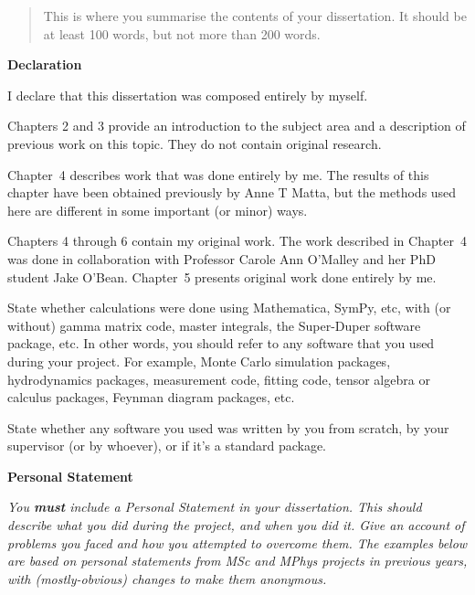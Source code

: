 \documentclass[12pt,a4paper]{report}
\numberwithin{equation}{section}
\theoremstyle{definition}
\theoremstyle{theorem}
\theoremstyle{theorem}
\theoremstyle{example}
\theoremstyle{definition}
\begin{document}
\newpage



\begin{abstract}
This is where you summarise the contents of your dissertation. It should be
at least 100 words, but not more than 200 words.
\end{abstract}


\begin{center}
\textbf{Declaration}
\end{center}

I declare that this dissertation was composed entirely by myself.

Chapters 2 and 3 provide an introduction to the subject area and a
description of previous work on this topic. They do not contain
original research.

Chapter~4 describes work that was done entirely by me. The results of
this chapter have been obtained previously by Anne T Matta, but the
methods used here are different in some important (or minor) ways.

Chapters 4 through 6 contain my original work. The work described in
Chapter~4 was done in collaboration with Professor Carole Ann O'Malley
and her PhD student Jake O'Bean. Chapter~5 presents original work done
entirely by me.

\bigskip

State whether calculations were done using Mathematica, SymPy, etc,
with (or without) gamma matrix code, master integrals, the Super-Duper
software package, etc. In other words, you should refer to any
software that you used during your project. For example, Monte Carlo
simulation packages, hydrodynamics packages, measurement code, fitting
code, tensor algebra or calculus packages, Feynman diagram packages,
etc.

State whether any software you used was written by you from scratch,
by your supervisor (or by whoever), or if it's a standard package.

\newpage

\begin{center}
\textbf{Personal Statement}
\end{center}

\emph{You \textbf{\emph{must}} include a Personal Statement in your
  dissertation. This should describe what you did during the project,
  and when you did it. Give an account of problems you faced and how
  you attempted to overcome them. The examples below are based on
  personal statements from MSc and MPhys projects in previous years,
  with (mostly-obvious) changes to make them anonymous. }
\end{document}
